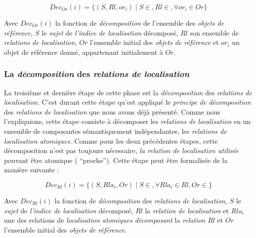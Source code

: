 \begin{equation}
  Dec_{Or}(i) = \{(S,Rl,or_i) \mid S \in , Rl \in , \forall or_i \in Or \} 
\end{equation}

Avec \(Dec_{Or}(i)\) la fonction de \emph{décomposition} de l'ensemble
des \emph{objets de référence,} \(S\) le \emph{sujet} de \emph{l'indice
  de localisation} décomposé, \(Rl\) son ensemble de \emph{relations
  de localisation,} \(Or\) l'ensemble initial des \emph{objets de
  référence} et \(or_i\) un objet de référence donné, appartenant
initialement à \(Or\).

\subsubsection{La \emph{décomposition} des \emph{relations de localisation}}

La troisième et dernière étape de cette phase est la
\emph{décomposition} des \emph{relations de localisation.} C'est
durant cette étape qu'est appliqué le \emph{principe de décomposition}
des \emph{relations de localisation} que nous avons déjà
présenté. Comme nous l'expliquions, cette étape consiste à décomposer
les \emph{relations de localisation} en un ensemble de composantes
sémantiquement indépendantes, les \emph{relations de localisation
  atomiques.} Comme pour les deux précédentes étapes, cette
décomposition n'est pas toujours nécessaire, \emph{la relation de
  localisation utilisée} pouvant être atomique (\eg
\enquote{proche}). Cette étape peut être formalisée de la manière
suivante :

\begin{equation}
  Dec_{Rl}(i) = \{(S,Rla_i,Or) \mid S \in, \forall Rla_i \in Rl,  Or \in \} 
\end{equation}

Avec \(Dec_{Rl}(i)\) la fonction de \emph{décomposition} des
\emph{relations de localisation,} \(S\) le \emph{sujet} de
\emph{l'indice de localisation} décomposé, \(Rl\) la \emph{relation de
  localisation} et \(Rla_i\) une des relations de \emph{localisation
  atomiques décomposant} la \emph{relation} \(Rl\) et \(Or\)
l'ensemble initial des \emph{objets de référence.}


